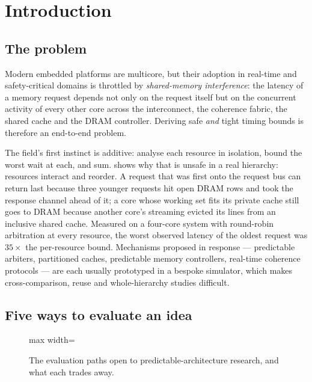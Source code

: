 \chapter{Introduction}\label{ch:introduction}


\section{The problem}

Modern embedded platforms are multicore, but their adoption in real-time and safety-critical
domains is throttled by \emph{shared-memory interference}: the latency of a memory request
depends not only on the request itself but on the concurrent activity of every other core
across the interconnect, the coherence fabric, the shared cache and the DRAM controller.
Deriving safe \emph{and} tight timing bounds is therefore an end-to-end problem.

The field's first instinct is additive: analyse each resource in isolation, bound the worst
wait at each, and sum.  shows why that is unsafe in a real
hierarchy: resources interact and reorder. A request that was first onto the request bus can
return last because three younger requests hit open DRAM rows and took the response channel
ahead of it; a core whose working set fits its private cache still goes to DRAM because another
core's streaming evicted its lines from an inclusive shared cache. Measured on a four-core
system with round-robin arbitration at every resource, the worst observed latency of the oldest
request was $35\times$ the per-resource bound. Mechanisms proposed in response --- predictable
arbiters, partitioned caches, predictable memory controllers, real-time coherence protocols
--- are each usually prototyped in a bespoke simulator, which makes cross-comparison, reuse and
whole-hierarchy studies difficult.

\section{Five ways to evaluate an idea}

\begin{figure}[htbp]\centering
\begin{adjustbox}{max width=\textwidth}\end{adjustbox}
\caption{The evaluation paths open to predictable-architecture research, and what each trades
away.}
\label{fig:evaluation-paths}
\end{figure}

